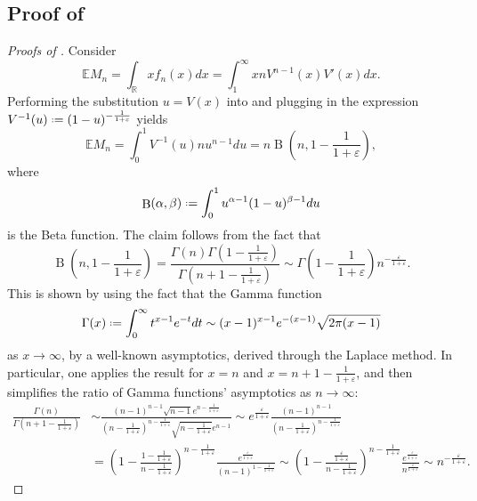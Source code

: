 \documentclass[11pt, a4paper, twoside]{article}
\newcommand*{\defeq}{\mathrel{\vcenter{\baselineskip0.5ex \lineskiplimit0pt
			\hbox{\scriptsize.}\hbox{\scriptsize.}}}=}
\newcommand{\eps}{\varepsilon}
\newcommand{\RR}{\mathbb{R}}
\newcommand{\EE}{\mathbb{E}}
\DeclareMathOperator{\Beta}{B}
\numberwithin{equation}{section}
\begin{document}
        \subsection{Proof of }\label{supphardsecretarylem}
        \begin{proof}[Proofs of ]
        Consider
        \begin{equation}\label{Emax}
		\EE M_n = \int_\RR xf_n(x)dx=\int_1^\infty xnV^{n-1}(x)V'(x)dx.
	\end{equation}
		Performing the substitution $u=V(x)$ into  and plugging in the expression $V^{-1}(u)\defeq (1-u)^{-\frac{1}{1+\eps}}$ yields
		\[\EE M_n =\int_0^{1}V^{-1}(u)nu^{n-1}du=n\Beta\left(n,1-\frac{1}{1+\eps}\right),\]
		where \[\Beta(\alpha,\beta)\defeq\int_0^1u^{\alpha-1}(1-u)^{\beta-1}du\] is the Beta function. The claim follows from the fact that 
		\begin{equation}\label{asympgamma}
			\Beta\left(n,1-\frac{1}{1+\eps}\right)=\frac{\Gamma(n)\Gamma\left(1-\frac{1}{1+\eps}\right)}{\Gamma\left(n+1-\frac{1}{1+\eps}\right)}\sim\Gamma\left(1-\frac{1}{1+\eps}\right) n^{-\frac{\eps}{1+\eps}}.
		\end{equation}
		This is shown by using the fact that the Gamma function \[\Gamma(x)\defeq\int_0^\infty t^{x-1}e^{-t}dt\sim(x-1)^{x-1}e^{-(x-1)}\sqrt{2\pi(x-1)}\] as $x\longrightarrow\infty$, by a well-known asymptotics, derived through the Laplace method. In particular, one applies the result for $x=n$ and $x=n+1-\frac{1}{1+\eps}$, and then simplifies the ratio of Gamma functions' asymptotics as $n\longrightarrow\infty$:
		\begin{align*}
			\frac{\Gamma(n)}{\Gamma\left(n+1-\frac{1}{1+\eps}\right)}&\sim\frac{(n-1)^{n-1}\sqrt{n-1}e^{n-\frac{1}{1+\eps}}}{\left(n-\frac{1}{1+\eps}\right)^{n-\frac{1}{1+\eps}}\sqrt{n-\frac{1}{1+\eps}}e^{n-1}}\sim e^{\frac{\eps}{1+\eps}} \frac{(n-1)^{n-1}}{\left(n-\frac{1}{1+\eps}\right)^{n-\frac{1}{1+\eps}}}\\&=\left(1-\frac{1-\frac{1}{1+\eps}}{n-\frac{1}{1+\eps}}\right)^{n-\frac{1}{1+\eps}}\frac{e^{\frac{\eps}{1+\eps}}}{(n-1)^{1-\frac{1}{1+\eps}}}\sim\left(1-\frac{\frac{\eps}{1+\eps}}{n-\frac{1}{1+\eps}}\right)^{n-\frac{1}{1+\eps}}\frac{e^{\frac{\eps}{1+\eps}}}{n^{\frac{\eps}{1+\eps}}}\sim n^{-\frac{\eps}{1+\eps}}.
		\end{align*}
	\end{proof}
 
\end{document}
